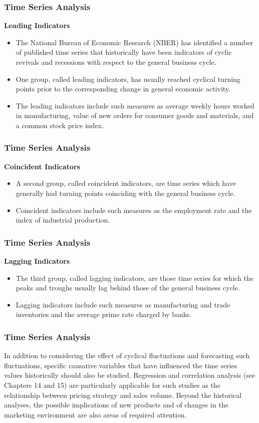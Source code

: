 \begin{frame}
\frametitle{Time Series Analysis}
\textbf{Leading Indicators}
\begin{itemize}
\item The National Bureau of Economic Research (NBER) has identified a number of published time series that
historically have been indicators of cyclic revivals and recessions with respect to the general business cycle.
\item One group, called leading indicators, has usually reached cyclical turning points prior to the corresponding
change in general economic activity. 
\item The leading indicators include such measures as average weekly hours
worked in manufacturing, value of new orders for consumer goods and materials, and a common stock price
index.
\end{itemize}
\end{frame}
\begin{frame}
\frametitle{Time Series Analysis}
\textbf{ Coincident Indicators}\\
\begin{itemize}
\item A second group, called coincident indicators, are time series which have generally had turning points
coinciding with the general business cycle.
\item Coincident indicators include such measures as the employment rate
and the index of industrial production. 
\end{itemize}
\end{frame}
\begin{frame}
\frametitle{Time Series Analysis}
\textbf{Lagging Indicators}\\
\begin{itemize}
\item The third group, called lagging indicators, are those time series for
which the peaks and troughs usually lag behind those of the general business cycle. 
\item Lagging indicators include
such measures as manufacturing and trade inventories and the average prime rate charged by banks.
\end{itemize}
\end{frame}
\begin{frame}
\frametitle{Time Series Analysis}
In addition to considering the effect of cyclical fluctuations and forecasting such fluctuations, specific
causative variables that have influenced the time series values historically should also be studied. Regression
and correlation analysis (see Chapters 14 and 15) are particularly applicable for such studies as the relationship
between pricing strategy and sales volume. Beyond the historical analyses, the possible implications of new
products and of changes in the marketing environment are also areas of required attention.
\end{frame}

